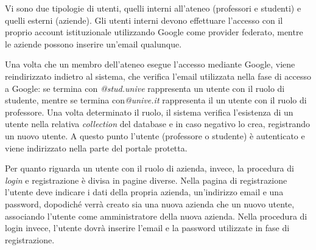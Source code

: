 \noindent
Vi sono due tipologie di utenti, quelli interni all'ateneo (professori e studenti) e quelli esterni (aziende). Gli utenti interni devono effettuare l'accesso con il proprio account istituzionale utilizzando Google come provider federato, mentre le aziende possono inserire un'email qualunque. 

Una volta che un membro dell'ateneo esegue l'accesso mediante Google, viene reindirizzato indietro al sistema, che verifica l'email utilizzata nella fase di accesso a Google: se termina con \textit{@stud.unive} rappresenta un utente con il ruolo di studente, mentre se termina con\textit{@unive.it} rappresenta il un utente con il ruolo di professore. Una volta determinato il ruolo, il sistema verifica l'esistenza di un utente nella relativa \textit{collection} del database e in caso negativo lo crea, registrando un nuovo utente. A questo punto l'utente (professore o studente) è autenticato e viene indirizzato nella parte del portale protetta.

Per quanto riguarda un utente con il ruolo di azienda, invece, la procedura di \textit{login} e registrazione è divisa in pagine diverse. Nella pagina di registrazione l'utente deve indicare i dati della propria azienda, un'indirizzo email e una password, dopodiché verrà creato sia una nuova azienda che un nuovo utente, associando l'utente come amministratore della nuova azienda. Nella procedura di login invece, l'utente dovrà inserire l'email e la password utilizzate in fase di registrazione.

